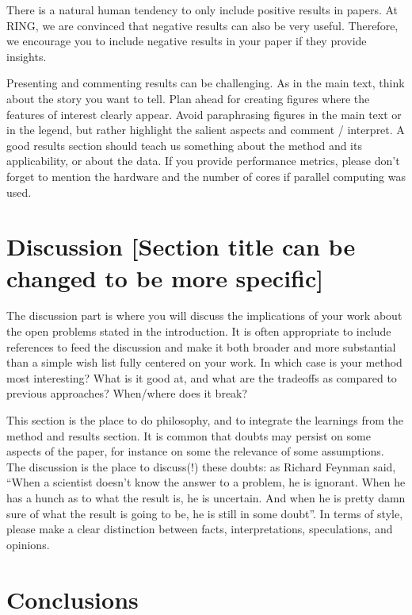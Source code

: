 \documentclass[preprint]{ring}
\begin{document}
There is a natural human tendency to only include positive results in papers. At RING, we are convinced that negative results can also be very useful. Therefore, we encourage you to include negative results in your paper if they provide insights. 

Presenting and commenting results can be challenging. As in the main text, think about the story you want to tell. Plan ahead for creating figures where the features of interest clearly appear. Avoid paraphrasing figures in the main text or in the legend, but rather highlight the salient aspects and comment / interpret. A good results section should teach us something about the method and its applicability, or about the data. If you provide performance metrics, please don't forget to mention the hardware and the number of cores if parallel computing was used.  


\section{Discussion [Section title can be changed to be more specific]}
\label{discussion}

The discussion part is where you will discuss the implications of your work about the open problems stated in the introduction. It is often appropriate to include references to feed the discussion and make it both broader and more substantial than a simple wish list fully centered on your work. In which case is your method most interesting? What is it good at, and what are the tradeoffs as compared to previous approaches? When/where does it break? 

This section is the place to do philosophy, and to integrate the learnings from the method and results section. It is common that doubts may persist on some aspects of the paper, for instance on some the relevance of some assumptions. The discussion is the place to discuss(!) these doubts: as Richard Feynman said, ``When a scientist doesn't know the answer to a problem, he is ignorant. When he has a hunch as to what the result is, he is uncertain. And when he is pretty damn sure of what the result is going to be, he is still in some doubt''. In terms of style, please make a clear distinction between facts, interpretations, speculations, and opinions. 

\section*{Conclusions}
\end{document}

